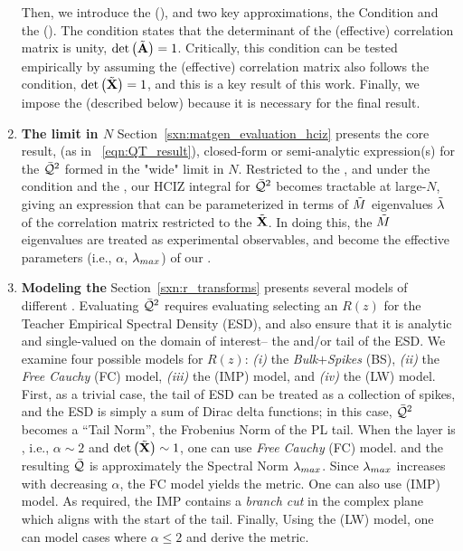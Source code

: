 \begin{enumerate}[label=5.\arabic*]
Then, we introduce the \EffectiveCorrelationSpace (\ECS), and two key approximations,
the \TRACELOG Condition and the \IndependentFluctuationApproximation (\IFA).
The \TRACELOG condition states that the determinant of the (effective) \Student correlation matrix is unity, $\mbox{}{\text{det}}\left(\tilde{\mathbf{A}}\right)=1$.
Critically, this condition can be tested empirically by assuming the (effective) \Teacher correlation matrix
also follows the \TRACELOG condition, $\mbox{}{\text{det}}\left(\tilde{\mathbf{X}}\right)=1$, and this is a key result of this work.
Finally, we impose the \IFA (described below) because it is necessary for the final result.

\item
\textbf{The \LargeN limit in $N$}
Section~\ref{sxn:matgen_evaluation_hciz} presents the core result,
(as in \EQN~\ref{eqn:QT_result}),
closed-form or semi-analytic expression(s) for the \LayerQualitySquared $\bar{\mathcal{Q}}^{2}$
formed in the "wide" \LargeN limit in $N$.
Restricted to the \ECS, and under the \TRACELOG condition and the \IFA, our
HCIZ integral for $\bar{\mathcal{Q}}^{2}$ becomes tractable at large-$N$, giving an expression that can be parameterized
in terms of $\tilde{M}$ eigenvalues $\tilde{\lambda}$ of the \Teacher correlation matrix 
restricted to the \ECS $\tilde{\mathbf{X}}$.
In doing this, the $\tilde{M}$ \Teacher eigenvalues are treated as experimental observables, and 
become the effective \SemiEmpirical parameters (i.e., $\alpha$, $\lambda_{max}$) of our \SETOL.

\item
\textbf{Modeling the \HeavyTailed \RTransform}
Section~\ref{sxn:r_transforms} presents several models of different \RTransforms.
Evaluating $\bar{\mathcal{Q}}^{2}$ requires evaluating selecting an \RTransform $R(z)$ for the Teacher Empirical Spectral Density (ESD),
and also ensure that it is analytic and single-valued on the domain of interest-- the \ECS and/or tail of the ESD.
We examine four possible models for $R(z)$: \emph{(i)} the \emph{Bulk$+$Spikes} (BS),
\emph{(ii)} the \emph{Free Cauchy} (FC) model, 
\emph{(iii)} the \emph{\InverseMP} (IMP) model, 
and \emph{(iv)} the  \LevyWigner (LW) model.
First, as a trivial case, the tail of ESD can be treated as a collection of spikes,
and the ESD is simply a sum of Dirac delta functions; in this case,
$\bar{\mathcal{Q}}^{2}$ becomes a ``Tail Norm'', the Frobenius Norm of the PL tail.
When the layer is \Ideal, i.e., $\alpha\sim 2$ and $\mbox{}{\text{det}}\left(\tilde{\mathbf{X}}\right)\sim 1$,
one can use  \emph{Free Cauchy} (FC) model.  and the resulting \LayerQuality $\bar{\mathcal{Q}}$
is approximately the Spectral Norm $\lambda_{max}$.
Since $\lambda_{max}$ increases with decreasing $\alpha$, the FC model yields the \HTSR \ALPHA metric.
One can also use  \emph{\InverseMP} (IMP) model. 
As required, the IMP \RTransform contains a \emph{branch cut} in the complex plane
which aligns with the start of the \ECS \PowerLaw tail.
Finally, Using the \LevyWigner (LW) model, one can model cases where
$\alpha\le 2$ and derive the \HTSR \ALPHAHAT metric.
\end{enumerate}

